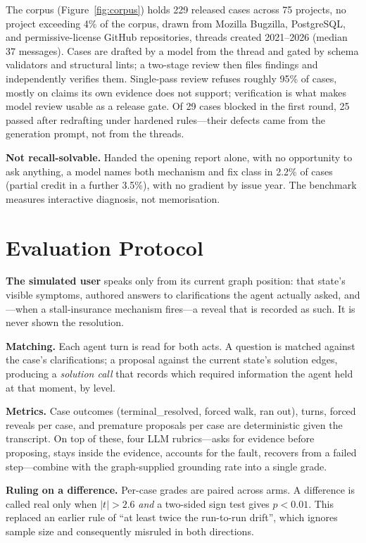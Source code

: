 \documentclass{article}
\newcommand{\fix}[1]{\textsf{#1}}
\begin{document}
The corpus (Figure~\ref{fig:corpus}) holds 229 released cases across 75
projects, no project exceeding 4\% of the corpus, drawn from Mozilla Bugzilla, PostgreSQL, and permissive-license
GitHub repositories, threads created 2021--2026 (median 37 messages).
Cases are drafted by a model from the thread and gated by schema
validators and structural lints; a two-stage review then files findings
and independently verifies them. Single-pass review refuses roughly 95\%
of cases, mostly on claims its own evidence does not support;
verification is what makes model review usable as a release gate. Of 29
cases blocked in the first round, 25 passed after redrafting under
hardened rules---their defects came from the generation prompt, not from
the threads.

\textbf{Not recall-solvable.} Handed the opening report alone, with no
opportunity to ask anything, a model names both mechanism and fix class
in 2.2\% of cases (partial credit in a further 3.5\%), with no gradient
by issue year. The benchmark measures interactive diagnosis, not
memorisation.

\section{Evaluation Protocol}
\label{sec:protocol}

\textbf{The simulated user} speaks only from its current graph position:
that state's visible symptoms, authored answers to clarifications the
agent actually asked, and---when a stall-insurance mechanism fires---a
reveal that is recorded as such. It is never shown the resolution.

\textbf{Matching.} Each agent turn is read for both acts. A question is
matched against the case's clarifications; a proposal against the current
state's solution edges, producing a \emph{solution call} that records
which required information the agent held at that moment, by level.

\textbf{Metrics.} Case outcomes (\fix{terminal\_resolved}, forced walk,
ran out), turns, forced reveals per case, and premature proposals per
case are deterministic given the transcript. On top of these, four LLM
rubrics---asks for evidence before proposing, stays inside the evidence,
accounts for the fault, recovers from a failed step---combine with the
graph-supplied grounding rate into a single \fix{grade}.

\textbf{Ruling on a difference.} Per-case grades are paired across arms.
A difference is called real only when $|t| > 2.6$ \emph{and} a two-sided
sign test gives $p < 0.01$. This replaced an earlier rule of ``at least
twice the run-to-run drift'', which ignores sample size and consequently
misruled in both directions.
\end{document}
